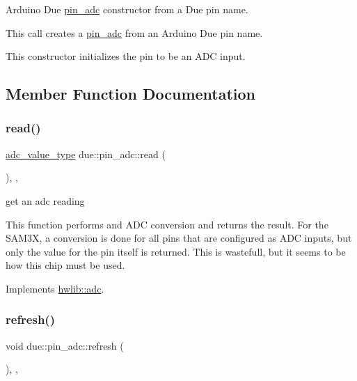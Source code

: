 Arduino Due \hyperlink{classdue_1_1pin__adc}{pin\+\_\+adc} constructor from a Due pin name. 

This call creates a \hyperlink{classdue_1_1pin__adc}{pin\+\_\+adc} from an Arduino Due pin name.

This constructor initializes the pin to be an A\+DC input. 

\subsection{Member Function Documentation}
\mbox{\label{classdue_1_1pin__adc_a3b562b594bbbe3e8815a9223fa6520cc}} 
\subsubsection{\texorpdfstring{read()}{read()}}
{\footnotesize\ttfamily \hyperlink{classhwlib_1_1adc_a1faacac0cc2f78e90652b17250cbe159}{adc\+\_\+value\+\_\+type} due\+::pin\+\_\+adc\+::read (\begin{DoxyParamCaption}{ }\end{DoxyParamCaption})\hspace{0.3cm}{\ttfamily [inline]}, {\ttfamily [override]}, {\ttfamily [virtual]}}



get an adc reading 

This function performs and A\+DC conversion and returns the result. For the S\+A\+M3X, a conversion is done for all pins that are configured as A\+DC inputs, but only the value for the pin itself is returned. This is wastefull, but it seems to be how this chip must be used. 

Implements \hyperlink{classhwlib_1_1adc_ac39b506d3ae4eec08caa5aa7e69ab2fb}{hwlib\+::adc}.

\mbox{\label{classdue_1_1pin__adc_ab30deacf575e1ef59af13aea24f77584}} 
\subsubsection{\texorpdfstring{refresh()}{refresh()}}
{\footnotesize\ttfamily void due\+::pin\+\_\+adc\+::refresh (\begin{DoxyParamCaption}{ }\end{DoxyParamCaption})\hspace{0.3cm}{\ttfamily [inline]}, {\ttfamily [override]}, {\ttfamily [virtual]}}

